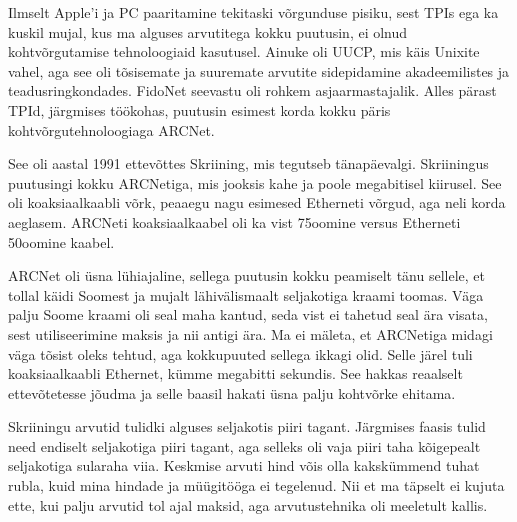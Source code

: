 
Ilmselt Apple'i ja PC paaritamine tekitaski võrgunduse 
pisiku, sest TPIs ega ka kuskil mujal, kus ma alguses arvutitega kokku 
puutusin, ei olnud kohtvõrgutamise tehnoloogiaid 
kasutusel. Ainuke oli UUCP, mis käis Unixite vahel, aga see oli 
tõsisemate ja suuremate arvutite sidepidamine akadeemilistes ja teadusringkondades. FidoNet seevastu oli 
rohkem asjaarmastajalik. Alles pärast TPId, järgmises töökohas, puutusin esimest 
korda kokku päris kohtvõrgutehnoloogiaga ARCNet.


See oli aastal 1991 ettevõttes Skriining, mis 
tegutseb tänapäevalgi. Skriiningus puutusingi kokku ARCNetiga, mis jooksis 
kahe ja poole megabitisel kiirusel. See oli koaksiaalkaabli võrk, 
peaaegu nagu esimesed Etherneti võrgud, aga neli korda aeglasem. ARCNeti koaksiaalkaabel oli ka vist 75oomine versus Etherneti 50oomine kaabel. 

ARCNet oli üsna lühiajaline, sellega puutusin kokku peamiselt 
tänu sellele, et tollal käidi Soomest ja mujalt lähivälismaalt 
seljakotiga kraami toomas. Väga palju Soome kraami oli 
seal maha kantud, seda vist ei tahetud seal ära visata, 
sest utiliseerimine maksis ja nii antigi ära. Ma ei mäleta, et ARCNetiga midagi väga tõsist oleks tehtud, aga 
kokkupuuted sellega ikkagi olid. Selle järel tuli koaksiaalkaabli Ethernet, kümme megabitti sekundis. See hakkas reaalselt ettevõtetesse jõudma ja selle baasil 
hakati üsna palju kohtvõrke ehitama.


Skriiningu arvutid tulidki alguses seljakotis piiri tagant. Järgmises faasis tulid need endiselt seljakotiga piiri tagant, aga 
selleks oli vaja piiri taha kõigepealt seljakotiga 
sularaha viia. Keskmise arvuti hind võis olla kakskümmend tuhat rubla, kuid mina hindade ja müügitööga ei tegelenud. Nii et ma täpselt ei kujuta ette, kui palju arvutid tol 
ajal maksid, aga arvutustehnika oli meeletult kallis.


